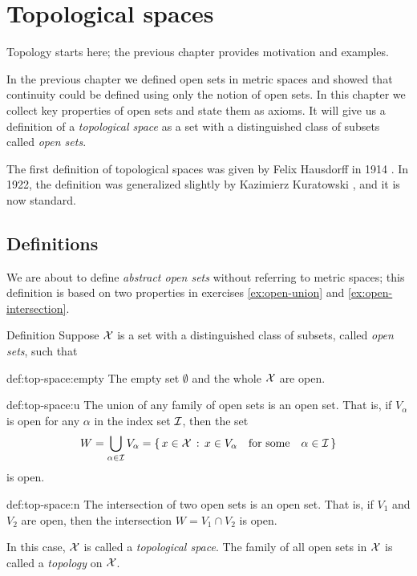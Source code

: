 \chapter{Topological spaces}\label{chap:topological-spaces}

Topology starts here; the previous chapter provides motivation and examples.

In the previous chapter we defined open sets in metric spaces
and showed that continuity could be defined using only the notion of open sets.
In this chapter we collect key properties of open sets and state them as axioms.
It will give us a definition of a \textit{topological space} as a set with a distinguished class of subsets called \textit{open sets}.

The first definition of topological spaces was given by Felix Hausdorff in 1914 \cite[VII § 1]{hausdorff1914}.
In 1922, the definition was generalized slightly by Kazimierz Kuratowski \cite{kuratowski1922}, and it is now standard.

\section{Definitions}

We are about to define \textit{abstract open sets} without referring to metric spaces;
this definition is based on two properties in exercises \ref{ex:open-union} and \ref{ex:open-intersection}.

\begin{thm}{Definition}\label{def:top-space}
Suppose $\mathcal{X}$ is a set 
with a distinguished class of subsets, called \emph{open sets}, such that

\begin{subthm}{def:top-space:empty}
The empty set $\emptyset$ and the whole $\mathcal{X}$ are open.
\end{subthm}

\begin{subthm}{def:top-space:u}
The union of any family of open sets is an open set.
That is, if $V_\alpha$ is open for any $\alpha$ in the index set $\mathcal{I}$,
then the set
\[W=\bigcup_{\alpha\in \mathcal{I}} V_\alpha
=
\left\{\,{x\in \mathcal{X}}\,:\,{x\in V_\alpha\quad\text{for some}\quad\alpha\in \mathcal{I}}\,\right\}\]
is open.
\end{subthm}

\begin{subthm}{def:top-space:n}
The intersection of two open sets is an open set.  
That is, if $V_1$ and $V_2$ are open, then the intersection $W=V_1 \cap V_2$ is open. 
\end{subthm}

In this case, $\mathcal{X}$ is called a \emph{topological space}.
The family of all open sets in $\mathcal{X}$ is called a \emph{topology} on $\mathcal{X}$.

\end{thm}

